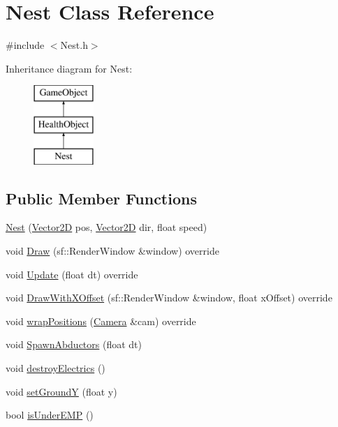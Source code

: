 \hypertarget{class_nest}{}\section{Nest Class Reference}
\label{class_nest}


{\ttfamily \#include $<$Nest.\+h$>$}

Inheritance diagram for Nest\+:\begin{figure}[H]
\begin{center}
\leavevmode
\includegraphics[height=3.000000cm]{class_nest}
\end{center}
\end{figure}
\subsection*{Public Member Functions}
\begin{DoxyCompactItemize}
\item 
\hyperlink{class_nest_a66b6012b3a0d2a9b00ec66cf5d312394}{Nest} (\hyperlink{class_vector2_d}{Vector2D} pos, \hyperlink{class_vector2_d}{Vector2D} dir, float speed)
\item 
void \hyperlink{class_nest_a5d38f9e047947336dd2830e936ce2386}{Draw} (sf\+::\+Render\+Window \&window) override
\item 
void \hyperlink{class_nest_a00bd75873d812a893b20b0391ca117b4}{Update} (float dt) override
\item 
void \hyperlink{class_nest_a43f88fdd7366b39bd7614f26433afe10}{Draw\+With\+X\+Offset} (sf\+::\+Render\+Window \&window, float x\+Offset) override
\item 
void \hyperlink{class_nest_a763db342ea691c22d37b4905c1d022fa}{wrap\+Positions} (\hyperlink{class_camera}{Camera} \&cam) override
\item 
void \hyperlink{class_nest_a981ac754a770ac168f034cb139b7726b}{Spawn\+Abductors} (float dt)
\item 
void \hyperlink{class_nest_a22039effa771e65a683e2dd084c04ded}{destroy\+Electrics} ()
\item 
void \hyperlink{class_nest_aa5a8307172777c880ba2747719a6a0f7}{set\+GroundY} (float y)
\item 
bool \hyperlink{class_nest_a436c3e1024545b8ce632105d2fac2c54}{is\+Under\+E\+MP} ()
\end{DoxyCompactItemize}
